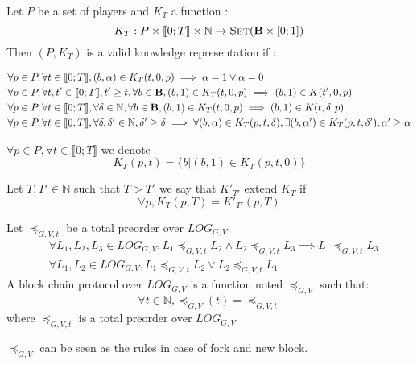 \begin{mydef}
Let $P$ be a set of players and $K_T$ a function :
$$K_{T} : P \times \llbracket 0;T \rrbracket \times \mathbb{N} \rightarrow \text{\sc Set}(\text{\bf B} \times [0;1])$$ 
Then $(P,K_{T})$ is a valid knowledge representation if :

\begin{eqnarray*}
&\forall p \in P,\forall t\in \llbracket 0;T \rrbracket, (b,\alpha) \in K_{T}(t,0,p) \implies \alpha = 1 \lor \alpha = 0\\
&\forall p \in P,\forall t,t'\in \llbracket 0;T \rrbracket, t' \geq t, \forall b \in \text{\bf B},  (b,1) \in K_{T}(t,0,p) \implies (b,1) \in K(t',0,p)  \\
&\forall p \in P,\forall t\in \llbracket 0;T \rrbracket, \forall \delta \in \mathbb{N}, \forall b \in \text{\bf B},  (b,1) \in K_{T}(t,0,p) \implies (b,1) \in K(t,\delta,p) \\
&\forall p \in P,\forall t\in \llbracket 0;T \rrbracket, \forall \delta,\delta' \in \mathbb{N}, \delta' \geq \delta \implies \forall (b,\alpha) \in K_{T}(p,t,\delta), \exists (b,\alpha') \in K_{T}(p,t,\delta'), \alpha'\geq \alpha\\
\end{eqnarray*}
\end{mydef}

\begin{mynota}
	$\forall p \in P, \forall t\in \llbracket 0;T \rrbracket$ we denote $$K_{T}(p,t)=\{b | (b,1) \in K_{T}(p,t,0)\}$$
\end{mynota}

\begin{mydef}
	Let $T,T' \in \mathbb{N}$ such that $T>T'$ we say that $K'_{T'}$ extend $K_{T}$ if $$\forall p, K_{T}(p,T) = K'_{T'}(p,T)$$
\end{mydef}

\begin{mydef}
	Let $\preceq_{G,V,t}$ be  a total preorder over $LOG_{G,V}$:
\begin{eqnarray*}		
	&\forall L_1, L_2, L_3 \in LOG_{G,V}, L_1 \preceq_{G,V,t} L_2 \land L_2 \preceq_{G,V,t} L_3 \implies L_1 \preceq_{G,V,t} L_3  \\
	&\forall L_1, L_2 \in LOG_{G,V}, L_1 \preceq_{G,V,t} L_2 \lor L_2 \preceq_{G,V,t} L_1 
\end{eqnarray*}
	A block chain protocol over $LOG_{G,V}$ is a function noted $\preceq_{G,V}$ such that: $$ \forall t \in \mathbb{N}, \preceq_{G,V}(t) =  \preceq_{G,V,t}$$ where $\preceq_{G,V,t}$ is a total preorder over $LOG_{G,V}$
\end{mydef}
\begin{myrem}
	$\preceq_{G,V}$ can be seen as the rules in case of fork and new block. 
\end{myrem}

